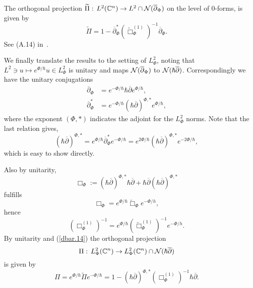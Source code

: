 \documentclass{article}
\newcommand{\CM}{\mathbb{C}}
\newcommand{\h}{\hbar}
\begin{document}
\par The orthogonal projection
$\widetilde{\Pi }:\, L^2(\CM^n)\to L^2\cap{\cal N}(\overline{\partial
}_\Phi )$ on the level of 0-forms, is given by
\begin{equation}\label{dbar.14}
  \widetilde{\Pi }=1-\overline{\partial }^*_\Phi (\widetilde{\Box}_\Phi
  ^{(1)})^{-1}\overline{\partial }_\Phi .
\end{equation}
See (A.14) in~\cite{sj-96}.

\par
We finally translate the results to the setting of $L^2_\Phi $, noting
that $L^2\ni u\mapsto e^{\Phi /\h}u\in L^2_\Phi $ is unitary and maps
${\cal N}(\overline{\partial }_\Phi )$ to
${\cal N}(\h \overline{\partial })$. Correspondingly we have the
unitary conjugations \begin{equation}\label{dbar.15} \begin{split}
    \overline{\partial }_\Phi &=e^{-\Phi /\h} \h\overline{\partial
    }e^{\Phi /\h},\\
    \overline{\partial }_\Phi^{*} &=e^{-\Phi /\h}
    (\h\overline{\partial })^{\Phi ,*}e^{\Phi
      /\h}, \end{split} \end{equation} where the exponent $(\Phi ,*)$
indicates the adjoint for the $L^2_\Phi $ norms.  Note that the last
relation gives,
\[
(\h \overline{\partial })^{\Phi ,*}=e^{\Phi /\h}\overline{\partial
}_\Phi ^* e^{-\Phi /\h}=e^{2\Phi /\h}(\h \overline{\partial })^{\Phi
  ,*} e^{-2\Phi /\h},
\]
which is easy to show directly.  \par Also by unitarity,
\[
\Box_{\Phi }:=(\h\overline{\partial })^{\Phi ,*}\h \overline{\partial
}+\h \overline{\partial }(\h\overline{\partial })^{\Phi ,*}
\]
fulfills
\begin{equation}\label{dbar.16}\Box_\Phi =e^{\Phi
    /\h}\widetilde{\Box}_\Phi e^{-\Phi /h}, 
\end{equation} hence
\[
(\Box^{(1)}_\Phi)^{-1} =e^{\Phi /\h}(\widetilde{\Box}_\Phi^{(1)})^{-1}
e^{-\Phi /h}.
\]
By unitarity and (\ref{dbar.14}) the orthogonal projection
\[
\Pi :\, L^2_\Phi (\CM^n)\to L^2_\Phi (\CM^n)\cap {\cal N}(\h
\overline{\partial })
\]
is given by
\begin{equation}\label{dbar.17}
  \Pi =e^{\Phi /\h }\widetilde{\Pi }e^{-\Phi /\h }=1-
  (\h\overline{\partial })^{\Phi,*} (\Box_\Phi
  ^{(1)})^{-1}\h\overline{\partial } .
\end{equation}
\end{document}
